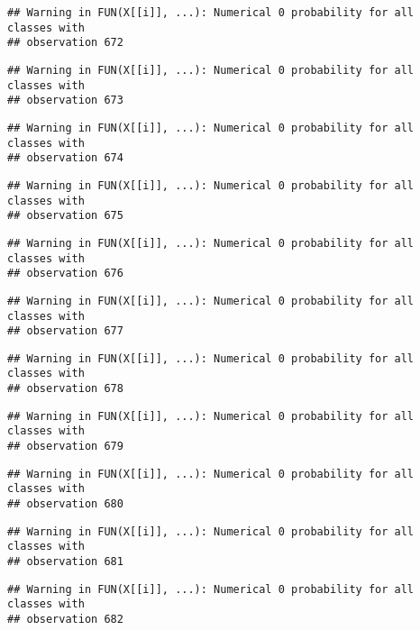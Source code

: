 \documentclass[
]{article}
\begin{document}
\begin{verbatim}
## Warning in FUN(X[[i]], ...): Numerical 0 probability for all classes with
## observation 672
\end{verbatim}

\begin{verbatim}
## Warning in FUN(X[[i]], ...): Numerical 0 probability for all classes with
## observation 673
\end{verbatim}

\begin{verbatim}
## Warning in FUN(X[[i]], ...): Numerical 0 probability for all classes with
## observation 674
\end{verbatim}

\begin{verbatim}
## Warning in FUN(X[[i]], ...): Numerical 0 probability for all classes with
## observation 675
\end{verbatim}

\begin{verbatim}
## Warning in FUN(X[[i]], ...): Numerical 0 probability for all classes with
## observation 676
\end{verbatim}

\begin{verbatim}
## Warning in FUN(X[[i]], ...): Numerical 0 probability for all classes with
## observation 677
\end{verbatim}

\begin{verbatim}
## Warning in FUN(X[[i]], ...): Numerical 0 probability for all classes with
## observation 678
\end{verbatim}

\begin{verbatim}
## Warning in FUN(X[[i]], ...): Numerical 0 probability for all classes with
## observation 679
\end{verbatim}

\begin{verbatim}
## Warning in FUN(X[[i]], ...): Numerical 0 probability for all classes with
## observation 680
\end{verbatim}

\begin{verbatim}
## Warning in FUN(X[[i]], ...): Numerical 0 probability for all classes with
## observation 681
\end{verbatim}

\begin{verbatim}
## Warning in FUN(X[[i]], ...): Numerical 0 probability for all classes with
## observation 682
\end{verbatim}
\end{document}
